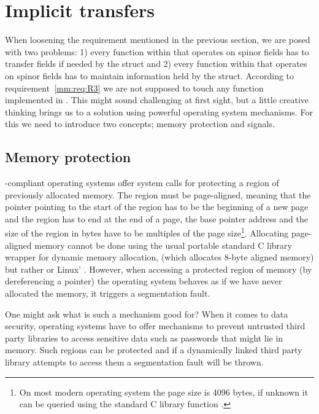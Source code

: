 \section{Implicit transfers}
\label{sec:mm:implicit:transfers}

When loosening the requirement mentioned in the previous section, we are posed with two problems:
1) every function within \openqxd that operates on spinor fields has to transfer fields if needed by the  struct and
2) every function within \openqxd that operates on spinor fields has to maintain information held by the  struct.
According to requirement~\ref{mm:req:R3} we are not supposed to touch any function implemented in \openqxd.
This might sound challenging at first sight, but a little creative thinking brings us to a solution using powerful operating system mechanisms.
For this we need to introduce two concepts; memory protection and signals.

\subsection{Memory protection}
\label{sec:mm:mprotect}

\Posix-compliant operating systems offer system calls for protecting a region of previously allocated memory.
The region must be page-aligned, meaning that the pointer pointing to the start of the region has to be the beginning of a new page and the region has to end at the end of a page, \ie the base pointer address and the size of the region in bytes have to be multiples of the page size\footnote{On most modern operating system the page size is \num{4096} bytes, if unknown it can be queried using the standard C library function .}.
Allocating page-aligned memory cannot be done using the usual portable standard C library wrapper for dynamic memory allocation,  (which allocates 8-byte aligned memory) but rather  or Linux' .
However, when accessing a protected region of memory (by dereferencing a pointer) the operating system behaves as if we have never allocated the memory, \ie it triggers a segmentation fault.

One might ask what is such a mechanism good for?
When it comes to data security, operating systems have to offer mechanisms to prevent untrusted third party libraries to access sensitive data such as passwords that might lie in memory.
Such regions can be protected and if a dynamically linked third party library attempts to access them a segmentation fault will be thrown.

